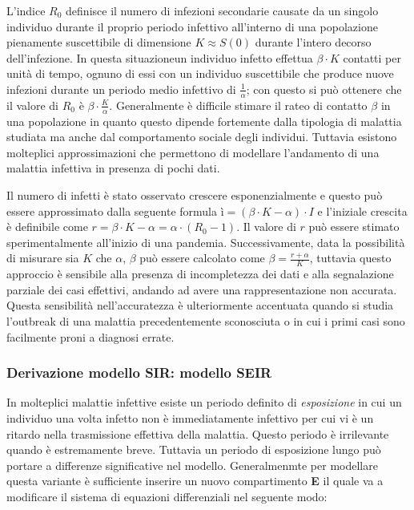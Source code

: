 L'indice $R_0$ definisce il numero di infezioni secondarie causate da un singolo individuo durante il proprio periodo infettivo 
all'interno di una popolazione pienamente suscettibile di dimensione $K \approx S(0)$ durante l'intero decorso dell'infezione. In 
questa situazioneun individuo infetto effettua $\beta \cdot K$ contatti per unità di tempo, ognuno di essi con un individuo suscettibile 
che produce nuove infezioni durante un periodo medio infettivo di $\frac{1}{\alpha}$; con questo si può ottenere che il valore di $R_0$ è 
$\beta \cdot \frac{K}{\alpha}$. Generalmente è difficile stimare il rateo di contatto $\beta$ in una popolazione in quanto questo dipende fortemente 
dalla tipologia di malattia studiata ma anche dal comportamento sociale degli individui. Tuttavia esistono molteplici approssimazioni 
che permettono di modellare l'andamento di una malattia infettiva in presenza di pochi dati. 

Il numero di infetti è stato osservato crescere esponenzialmente e questo può essere approssimato dalla seguente formula $ì = (\beta \cdot K - \alpha) \cdot I$
e l'iniziale crescita è definibile come $r = \beta \cdot K - \alpha = \alpha \cdot (R_0 - 1)$. Il valore di $r$ può essere stimato sperimentalmente 
all'inizio di una pandemia. Successivamente, data la possibilità di misurare sia $K$ che $\alpha$, $\beta$ può essere calcolato come 
$\beta = \frac{r + \alpha}{K}$, tuttavia questo approccio è sensibile alla presenza di incompletezza dei dati e alla segnalazione parziale dei casi effettivi, andando 
ad avere una rappresentazione non accurata. Questa sensibilità nell'accuratezza è ulteriormente accentuata quando si studia l'outbreak di una malattia 
precedentemente sconosciuta o in cui i primi casi sono facilmente proni a diagnosi errate.   

\subsubsection{Derivazione modello SIR: modello SEIR}
In molteplici malattie infettive esiste un periodo definito di \emph{esposizione} \cite{wiki:Incubation_period} in cui un individuo una volta infetto non 
è immediatamente infettivo per cui vi è un ritardo nella trasmissione effettiva della malattia. Questo periodo è irrilevante quando è estremamente breve. 
Tuttavia un periodo di esposizione lungo può portare a differenze significative nel modello. Generalmenmte per modellare questa variante è sufficiente 
inserire un nuovo compartimento \textbf{E} il quale va a modificare il sistema di equazioni differenziali nel seguente modo:

